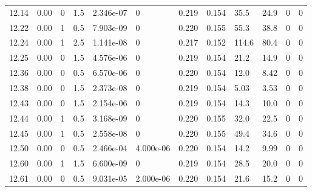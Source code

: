 \documentclass[preview]{standalone}
\begin{document}
{{{{{\begin{tabular}{L{1.2cm}C{1.2cm} C{0.3cm}C{0.5cm} C{1.4cm}C{1.4cm} C{1.4cm}C{1.4cm} C{1.6cm}C{1.6cm} C{1.6cm}C{1.6cm}}
  12.14  &  0.00  & 0     & 1.5 &  2.346e-07  & 0  &  0.219&   0.154& 35.5 & 24.9   &  0 & 0  \\ 
  12.22  &  0.00  & 1     & 0.5 &  7.903e-09  & 0  &  0.220&   0.155& 55.3 & 38.8   &  0 & 0  \\ 
  12.24  &  0.00  & 1     & 2.5 &  1.141e-08  & 0  &  0.217&   0.152& 114.6 & 80.4   &  0 & 0  \\ 
  12.25  &  0.00  & 0     & 1.5 &  4.576e-06  & 0  &  0.219&   0.154& 21.2 & 14.9   &  0 & 0  \\ 
  12.36  &  0.00  & 0     & 0.5 &  6.570e-06  & 0  &  0.220&   0.154& 12.0 & 8.42   &  0 & 0  \\ 
  12.38  &  0.00  & 0     & 1.5 &  2.373e-08  & 0  &  0.219&   0.154& 5.03 & 3.53   &  0 & 0  \\ 
  12.43  &  0.00  & 0     & 1.5 &  2.154e-06  & 0  &  0.219&   0.154& 14.3 & 10.0   &  0 & 0  \\ 
  12.44  &  0.00  & 1     & 0.5 &  3.168e-09  & 0  &  0.220&   0.155& 32.0 & 22.5   &  0 & 0  \\ 
  12.45  &  0.00  & 1     & 0.5 &  2.558e-08  & 0  &  0.220&   0.155& 49.4 & 34.6   &  0 & 0  \\ 
  12.50  &  0.00  & 0     & 0.5 &  2.466e-04  & 4.000e-06  &  0.220&   0.154& 14.2 & 9.99   &  0 & 0  \\ 
  12.60  &  0.00  & 1     & 1.5 &  6.600e-09  & 0  &  0.219&   0.154& 28.5 & 20.0   &  0 & 0  \\ 
  12.61  &  0.00  & 0     & 0.5 &  9.031e-05  & 2.000e-06  &  0.220&   0.154& 21.6 & 15.2   &  0 & 0  \\ 
\hline 
\end{tabular} 

}}}}}
\end{document}
